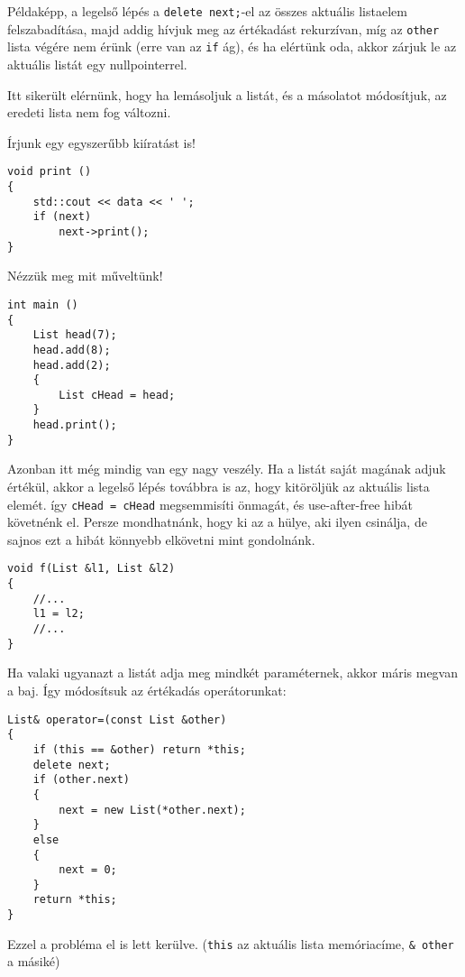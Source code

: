 \documentclass[a4paper,11.5pt]{article}
\begin{document}
	Példaképp, a legelső lépés a \texttt{delete next;}-el az összes aktuális listaelem felszabadítása, majd addig hívjuk meg az értékadást rekurzívan, míg az \texttt{other} lista végére nem érünk (erre van az \texttt{if} ág), és ha elértünk oda, akkor zárjuk le az aktuális listát egy nullpointerrel. 
	
	Itt sikerült elérnünk, hogy ha lemásoljuk a listát, és a másolatot módosítjuk, az eredeti lista nem fog változni.
	\medskip
	
	Írjunk egy egyszerűbb kiíratást is!
	\begin{lstlisting}
void print ()
{
	std::cout << data << ' ';
	if (next)
		next->print();
}
	\end{lstlisting}
	Nézzük meg mit műveltünk!
	\begin{lstlisting}
int main ()
{
	List head(7);
	head.add(8);
	head.add(2);
	{
		List cHead = head;
	}
	head.print();
}
	\end{lstlisting}
	Azonban itt még mindig van egy nagy veszély. Ha a listát saját magának adjuk értékül, akkor a legelső lépés továbbra is az, hogy kitöröljük az aktuális lista elemét. így \texttt{cHead = cHead} megsemmisíti önmagát, és use-after-free hibát követnénk el. Persze mondhatnánk, hogy ki az a hülye, aki ilyen csinálja, de sajnos ezt a hibát könnyebb elkövetni mint gondolnánk.
	\begin{lstlisting}
void f(List &l1, List &l2)
{
	//...
	l1 = l2;
	//...
}
	\end{lstlisting}
	Ha valaki ugyanazt a listát adja meg mindkét paraméternek, akkor máris megvan a baj. Így módosítsuk az értékadás operátorunkat:
\begin{lstlisting}
List& operator=(const List &other)
{
	if (this == &other) return *this;
	delete next;
	if (other.next)
	{
		next = new List(*other.next);
	}
	else
	{
		next = 0;
	}
	return *this;
}
\end{lstlisting}
	Ezzel a probléma el is lett kerülve. (\texttt{this} az aktuális lista memóriacíme, \texttt{\& other} a másiké)
	\medskip
	
\end{document}
